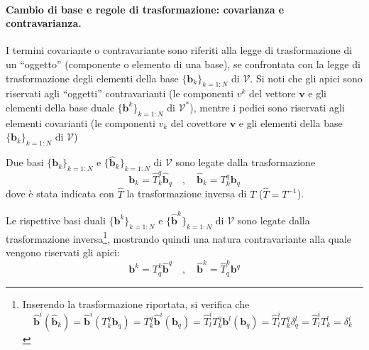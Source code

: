   \paragraph{Cambio di base e regole di trasformazione: covarianza e contravarianza.}
  I termini covariante o contravariante sono riferiti alla legge di trasformazione di un ``oggetto'' (componente o elemento di una base),
  se confrontata con la legge di trasformazione degli elementi della base $\{ \bm{b}_k \}_{k=1:N}$ di $\mathcal{V}$.
  Si noti che gli apici sono riservati agli ``oggetti'' contravarianti (le componenti $v^k$ del vettore
  $\bm{v}$ e gli elementi della base duale $\{ \bm{b}^k \}_{k=1:N}$ di $\mathcal{V}^*$), mentre i pedici sono riservati 
  agli elementi covarianti (le componenti $v_k$ del covettore $\bm{v}$ e gli elementi della base $\{ \bm{b}_k \}_{k=1:N}$ di $\mathcal{V}$)
  
  Due basi $\{ \bm{b}_k \}_{k=1:N}$
 e $\{ \bm{\hat{b}}_k \}_{k=1:N}$ di $\mathcal{V}$ sono legate dalla trasformazione
\begin{equation}
  \bm{b}_k = \hat{T}^q_k \bm{\hat{b}}_q \quad , \quad \bm{\hat{b}}_k = {T}^q_k \bm{b}_q
\end{equation}
 dove è stata indicata con $\hat{T}$ la trasformazione inversa di $T$ ($\hat{T} = T^{-1}$).

 \noindent
 Le rispettive basi duali $\{ \bm{b}^k \}_{k=1:N}$ e $\{ \bm{\hat{b}}^k \}_{k=1:N}$ di $\mathcal{V}$ sono legate
 dalla trasformazione inversa\footnote{
 Inserendo la trasformazione riportata, si verifica che
 \begin{equation}
 \bm{\hat{b}}^i (\bm{\hat{b}}_k) = \bm{\hat{b}}^i (T^q_k \bm{b}_q) = T^q_k \bm{\hat{b}}^i (\bm{b}_q) =
  \hat{T}^i_l T^q_k \bm{b}^l (\bm{b}_q) = \hat{T}^i_l T^q_k \delta^l_q =  \hat{T}^i_l T^l_k = \delta^i_k
 \end{equation}
 }, mostrando quindi una natura contravariante alla quale vengono riservati gli apici:
 \begin{equation}
  \bm{b}^k = T^k_q \bm{\hat{b}}^q \quad , \quad \bm{\hat{b}}^k = \hat{T}^k_q \bm{b}^q 
 \end{equation}
 
